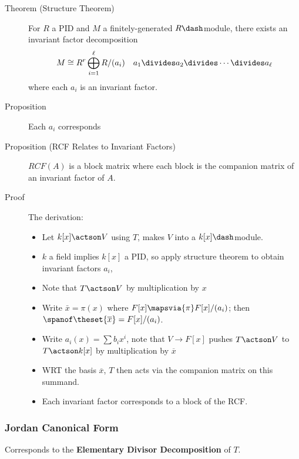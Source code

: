 \begin{description}
\item[Theorem (Structure Theorem)]
For \(R\) a PID and \(M\) a finitely-generated \(R\dash\)module, there
exists an invariant factor decomposition \begin{align*}
M \cong R^r \bigoplus_{i=1}^\ell R/(a_i) \quad a_1 \divides a_2 \divides \cdots \divides a_\ell
\end{align*} where each \(a_i\) is an invariant factor.
\item[Proposition]
Each \(a_i\) corresponds
\item[Proposition (RCF Relates to Invariant Factors)]
\(RCF(A)\) is a block matrix where each block is the companion matrix of
an invariant factor of \(A\).
\item[Proof]
The derivation:

\begin{itemize}
\item
  Let \(k[x] \actson V\) using \(T\), makes \(V\) into a
  \(k[x]\dash\)module.
\item
  \(k\) a field implies \(k[x]\) a PID, so apply structure theorem to
  obtain invariant factors \(a_i\),
\item
  Note that \(T\actson V\) by multiplication by \(x\)
\item
  Write \(\bar x = \pi(x)\) where \(F[x] \mapsvia{\pi} F[x]/(a_i)\);
  then \(\spanof\theset{\overline x} = F[x]/(a_i)\).
\item
  Write \(a_i(x) = \sum b_i x^i\), note that \(V \to F[x]\) pushes
  \(T\actson V\) to \(T\actson k[x]\) by multiplication by
  \(\overline x\)
\item
  WRT the basis \(\overline x\), \(T\) then acts via the companion
  matrix on this summand.
\item
  Each invariant factor corresponds to a block of the RCF.
\end{itemize}
\end{description}

\hypertarget{jordan-canonical-form}{%
\subsubsection{Jordan Canonical Form}\label{jordan-canonical-form}}

Corresponds to the \textbf{Elementary Divisor Decomposition} of \(T\).

